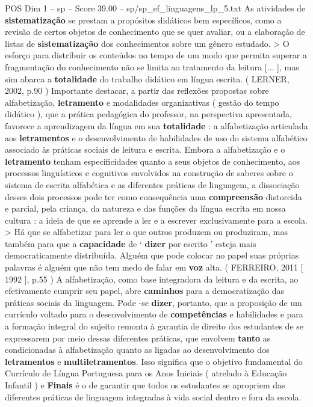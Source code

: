 \begin{textsample}{POS Dim 1 – sp – Score 39.00 – sp/sp\_ef\_linguagens\_lp\_5.txt}
As atividades de \textbf{sistematização} se prestam a propósitos didáticos bem específicos, como a revisão de certos objetos de conhecimento que se quer avaliar, ou a elaboração de listas de \textbf{sistematização} dos conhecimentos sobre um gênero estudado. > O esforço para distribuir os conteúdos no tempo de um modo que permita superar a fragmentação do conhecimento não se limita ao tratamento da leitura [... ], mas sim abarca a \textbf{totalidade} do trabalho didático em língua escrita. ( LERNER, 2002, p.90 ) Importante destacar, a partir das reflexões propostas sobre alfabetização, \textbf{letramento} e modalidades organizativas ( gestão do tempo didático ), que a prática pedagógica do professor, na perspectiva apresentada, favorece a aprendizagem da língua em sua \textbf{totalidade} : a alfabetização articulada aos \textbf{letramentos} e o desenvolvimento de habilidades de uso do sistema alfabético associado às práticas sociais de leitura e escrita.
Embora a alfabetização e o \textbf{letramento} tenham especificidades quanto a seus objetos de conhecimento, aos processos linguísticos e cognitivos envolvidos na construção de saberes sobre o sistema de escrita alfabética e as diferentes práticas de linguagem, a dissociação desses dois processos pode ter como consequência uma \textbf{compreensão} distorcida e parcial, pela criança, da natureza e das funções da língua escrita em nossa cultura : a ideia de que se aprende a ler e a escrever exclusivamente para a escola. > Há que se alfabetizar para ler o que outros produzem ou produziram, mas também para que a \textbf{capacidade} de ‘ \textbf{dizer} por escrito ’ esteja mais democraticamente distribuída.
Alguém que pode colocar no papel suas próprias palavras é alguém que não tem medo de falar em \textbf{voz} alta. ( FERREIRO, 2011 [ 1992 ], p.55 ) A alfabetização, como base integradora da leitura e da escrita, ao efetivamente cumprir seu papel, abre \textbf{caminhos} para a democratização das práticas sociais da linguagem.
Pode -se \textbf{dizer}, portanto, que a proposição de um currículo voltado para o desenvolvimento de \textbf{competências} e habilidades e para a formação integral do sujeito remonta à garantia de direito dos estudantes de se expressarem por meio dessas diferentes práticas, que envolvem \textbf{tanto} as condicionadas à alfabetização quanto as ligadas ao desenvolvimento dos \textbf{letramentos} e \textbf{multiletramentos}.
Isso significa que o objetivo fundamental do Currículo de Língua Portuguesa para os Anos Iniciais ( atrelado à Educação Infantil ) e \textbf{Finais} é o de garantir que todos os estudantes se apropriem das diferentes práticas de linguagem integradas à vida social dentro e fora da escola.

\end{textsample}

